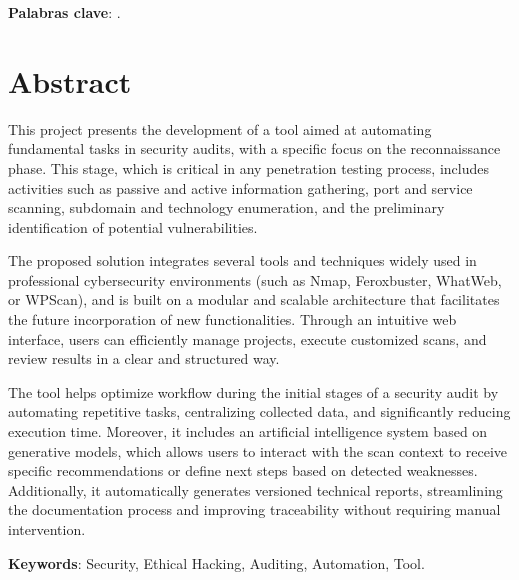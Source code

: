 \documentclass[minitoc, hidelinks, headlogo, framedcover]{tfeEPCC}
\begin{document}
\noindent\textbf{Palabras clave}: \printkeywords.

\chapter*{Abstract}
This project presents the development of a tool aimed at automating fundamental tasks in security audits, with a specific focus on the reconnaissance phase. This stage, which is critical in any penetration testing process, includes activities such as passive and active information gathering, port and service scanning, subdomain and technology enumeration, and the preliminary identification of potential vulnerabilities.

The proposed solution integrates several tools and techniques widely used in professional cybersecurity environments (such as Nmap, Feroxbuster, WhatWeb, or WPScan), and is built on a modular and scalable architecture that facilitates the future incorporation of new functionalities. Through an intuitive web interface, users can efficiently manage projects, execute customized scans, and review results in a clear and structured way.

The tool helps optimize workflow during the initial stages of a security audit by automating repetitive tasks, centralizing collected data, and significantly reducing execution time. Moreover, it includes an artificial intelligence system based on generative models, which allows users to interact with the scan context to receive specific recommendations or define next steps based on detected weaknesses. Additionally, it automatically generates versioned technical reports, streamlining the documentation process and improving traceability without requiring manual intervention.

\noindent\textbf{Keywords}: Security, Ethical Hacking, Auditing, Automation, Tool.

\newpage
\pagestyle{plain}
\setcounter{page}{1}
\tableofcontents
\newpage
\listoftables
\newpage
\listoffigures
\newpage
\end{document}
